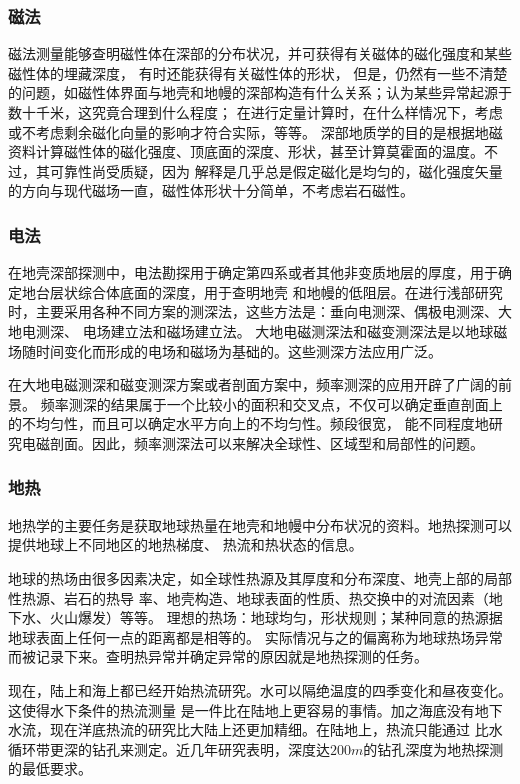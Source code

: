 \documentclass[hyperref,UTF-8]{ctexart}
\begin{document}
\subsubsection{磁法}
磁法测量能够查明磁性体在深部的分布状况，并可获得有关磁体的磁化强度和某些磁性体的埋藏深度，
有时还能获得有关磁性体的形状，
但是，仍然有一些不清楚的问题，如磁性体界面与地壳和地幔的深部构造有什么关系；认为某些异常起源于数十千米，这究竟合理到什么程度；
在进行定量计算时，在什么样情况下，考虑或不考虑剩余磁化向量的影响才符合实际，等等。
深部地质学的目的是根据地磁资料计算磁性体的磁化强度、顶底面的深度、形状，甚至计算莫霍面的温度。不过，其可靠性尚受质疑，因为
解释是几乎总是假定磁化是均匀的，磁化强度矢量的方向与现代磁场一直，磁性体形状十分简单，不考虑岩石磁性。
\subsubsection{电法}
在地壳深部探测中，电法勘探用于确定第四系或者其他非变质地层的厚度，用于确定地台层状综合体底面的深度，用于查明地壳
和地幔的低阻层。在进行浅部研究时，主要采用各种不同方案的测深法，这些方法是：垂向电测深、偶极电测深、大地电测深、
电场建立法和磁场建立法。
大地电磁测深法和磁变测深法是以地球磁场随时间变化而形成的电场和磁场为基础的。这些测深方法应用广泛。

在大地电磁测深和磁变测深方案或者剖面方案中，频率测深的应用开辟了广阔的前景。
频率测深的结果属于一个比较小的面积和交叉点，不仅可以确定垂直剖面上的不均匀性，而且可以确定水平方向上的不均匀性。频段很宽，
能不同程度地研究电磁剖面。因此，频率测深法可以来解决全球性、区域型和局部性的问题。
\subsubsection{地热}
地热学的主要任务是获取地球热量在地壳和地幔中分布状况的资料。地热探测可以提供地球上不同地区的地热梯度、
热流和热状态的信息。

地球的热场由很多因素决定，如全球性热源及其厚度和分布深度、地壳上部的局部性热源、岩石的热导
率、地壳构造、地球表面的性质、热交换中的对流因素（地下水、火山爆发）等等。
理想的热场：地球均匀，形状规则；某种同意的热源据地球表面上任何一点的距离都是相等的。
实际情况与之的偏离称为地球热场异常而被记录下来。查明热异常并确定异常的原因就是地热探测的任务。

现在，陆上和海上都已经开始热流研究。水可以隔绝温度的四季变化和昼夜变化。这使得水下条件的热流测量
是一件比在陆地上更容易的事情。加之海底没有地下水流，现在洋底热流的研究比大陆上还更加精细。在陆地上，热流只能通过
比水循环带更深的钻孔来测定。近几年研究表明，深度达$200m$的钻孔深度为地热探测的最低要求。
\end{document}

